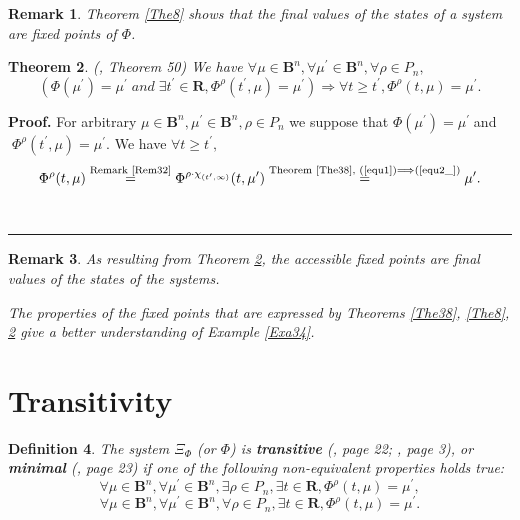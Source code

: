 \documentclass[12pt]{article}\usepackage{amsmath}
\newtheorem{theorem}{Theorem}
\newtheorem{definition}[theorem]{Definition}
\newtheorem{remark}[theorem]{Remark}
\newenvironment{proof}[1][Proof]{\textbf{#1.} }{\ \rule{0.5em}{0.5em}}
\begin{document}
\begin{remark}
Theorem \ref{The8} shows that the final values of the states of a system are
fixed points of $\Phi$.
\end{remark}

\begin{theorem}
\label{The9}(\cite{bib7}, Theorem 50) We have $\forall\mu\in\mathbf{B}^{n},\forall\mu^{\prime}\in\mathbf{B}^{n},\forall\rho\in P_{n},$\[
(\Phi(\mu^{\prime})=\mu^{\prime}\;and\;\exists t^{\prime}\in\mathbf{R},\Phi^{\rho}(t^{\prime},\mu)=\mu^{\prime})\Longrightarrow\forall t\geq
t^{\prime},\Phi^{\rho}(t,\mu)=\mu^{\prime}.
\]

\end{theorem}

\begin{proof}
For arbitrary $\mu\in\mathbf{B}^{n},\mu^{\prime}\in\mathbf{B}^{n},\rho\in
P_{n}$ we suppose that $\Phi(\mu^{\prime})=\mu^{\prime}\;$and$\;\Phi^{\rho
}(t^{\prime},\mu)=\mu^{\prime}.$ We have $\forall t\geq t^{\prime},$\[
\Phi^{\rho}(t,\mu)\overset{\text{Remark \ref{Rem32}}}{=}\Phi^{\rho\cdot
\chi_{(t^{\prime},\infty)}}(t,\mu^{\prime})\overset{\text{Theorem \ref{The38},
(\ref{equ1})}\Longrightarrow\text{(\ref{equ2_})}}{=}\mu^{\prime}.
\]

\end{proof}

\begin{remark}
As resulting from Theorem \ref{The9}, the accessible fixed points are final
values of the states of the systems.

The properties of the fixed points that are expressed by Theorems \ref{The38},
\ref{The8}, \ref{The9} give a better understanding of Example \ref{Exa34}.
\end{remark}

\section{Transitivity}

\begin{definition}
\label{Def108}The system $\Xi_{\Phi}$ (or $\Phi$) is \textbf{transitive}
(\cite{bib4}, page 22; \cite{bib3}, page 3), or \textbf{minimal} (\cite{bib4},
page 23) if one of the following non-equivalent properties holds true:\begin{equation}
\forall\mu\in\mathbf{B}^{n},\forall\mu^{\prime}\in\mathbf{B}^{n},\exists
\rho\in P_{n},\exists t\in\mathbf{R},\Phi^{\rho}(t,\mu)=\mu^{\prime},
\label{tt1}\end{equation}\begin{equation}
\forall\mu\in\mathbf{B}^{n},\forall\mu^{\prime}\in\mathbf{B}^{n},\forall
\rho\in P_{n},\exists t\in\mathbf{R},\Phi^{\rho}(t,\mu)=\mu^{\prime}.
\label{tt2}\end{equation}

\end{definition}
\end{document}
